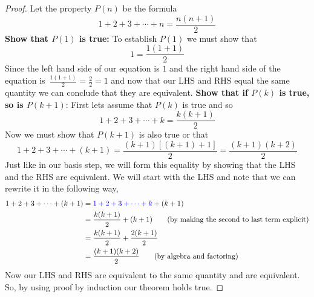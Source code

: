 \documentclass[addpoints]{exam}
\begin{document}
	\begin{proof}
		Let the property $P(n)$ be the formula
		\[
			1 + 2 + 3 + \cdots + n = \frac{n(n+1)}{2}
		\]
		\newline\textbf{Show that $P(1)$ is true:} To establish $P(1)$ we must show that
		\[
			1 = \frac{1(1+1)}{2}
		\]
		Since the left hand side of our equation is $1$ and the right hand side of the equation is $\displaystyle\,\frac{1(1+1)}{2}=\frac{2}{2} = 1$ and now that our LHS and RHS equal the same quantity we can conclude that they are equivalent.
		\newline\textbf{Show that if $P(k)$ is true, so is $P(k+1)$}: First lets assume that $P(k)$ is true and so
		\[
			1 + 2 + 3 + \cdots + k = \frac{k(k+1)}{2}
		\]
		Now we must show that $P(k+1)$ is also true or that
		\[
			1 + 2 + 3 + \cdots + (k+1) = \frac{\left(k+1\right)\left[\left(k+1\right)+1\right]}{2} = \frac{\left(k+1\right)\left(k+2\right)}{2}
		\]
		Just like in our basis step, we will form this equality by showing that the LHS and the RHS are equivalent. We will start with the LHS and note that we can rewrite it in the following way,
		\begin{align*}
			1 + 2 + 3 + \cdots + (k+1) & = \textcolor{blue}{1 + 2 + 3 + \cdots + k} + (k + 1)                        \\
			                           & = \frac{k(k+1)}{2} + (k+1) \tag{by making the second to last term explicit} \\
			                           & = \frac{k(k+1)}{2} + \frac{2(k+1)}{2}                                       \\
			                           & = \frac{(k+1)(k+2)}{2} \tag{by algebra and factoring}
		\end{align*}
		Now our LHS and RHS are equivalent to the same quantity and are equivalent. So, by using proof by induction our theorem holds true.
	\end{proof}
\else
\end{document}
